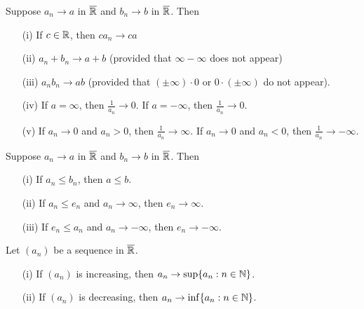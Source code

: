\documentclass[a4paper]{article}
\begin{document}
\begin{theorem}
    Suppose \( {a}_{n} \to a  \) in \( \overline{\mathbb{R}} \) and \( {b}_{n} \to b  \) in \( \overline{\mathbb{R}} \). Then
    \begin{enumerate}
        \item[(i)] If \( c \in \mathbb{R}  \), then \( {ca}_{n} \to ca \)
        \item[(ii)] \( {a}_{n} + {b}_{n} \to a + b \) (provided that \( \infty  - \infty   \) does not appear)
        \item[(iii)] \( {a}_{n}{b}_{n} \to ab \) (provided that \( (\pm \infty ) \cdot 0  \) or \( 0 \cdot (\pm \infty)  \) do not appear).
        \item[(iv)] If \( a = \infty   \), then \( \frac{ 1 }{ {a}_{n} }  \to 0  \). If \( a = - \infty  \), then \( \frac{ 1 }{ {a}_{n}  } \to 0  \).
        \item[(v)] If \( {a}_{n} \to 0  \) and \( {a}_{n} > 0  \), then \( \frac{ 1 }{ {a}_{n} }  \to \infty  \). If \( {a}_{n} \to 0  \) and \( {a}_{n} < 0  \), then \( \frac{ 1 }{ {a}_{n} } \to - \infty  \).
    \end{enumerate}
\end{theorem}

\begin{theorem}
    Suppose \( {a}_{n} \to a  \) in \( \overline{\mathbb{R}} \) and \( {b}_{n} \to b  \) in \( \overline{\mathbb{R}} \). Then
    \begin{enumerate}
        \item[(i)] If \( {a}_{n} \leq {b}_{n}  \), then \( a \leq b\).
        \item[(ii)] If \( {a}_{n} \leq {e}_{n} \) and \( {a}_{n} \to \infty   \), then \( {e}_{n} \to \infty   \).
        \item[(iii)] If \( {e}_{n} \leq {a}_{n}  \) and \( {a}_{n} \to - \infty  \), then \( {e}_{n} \to - \infty  \).
    \end{enumerate}
\end{theorem}

\begin{theorem}
    Let \( ({a}_{n}) \) be a sequence in \( \overline{\mathbb{R}} \).
    \begin{enumerate}
        \item[(i)] If \( ({a}_{n}) \) is increasing, then \( {a}_{n} \to \sup \{ {a}_{n} : n \in \mathbb{N} \}  \).
        \item[(ii)] If \( ({a}_{n})  \) is decreasing, then \( {a}_{n} \to \inf \{  {a}_{n} : n \in \mathbb{N} \}  \).
    \end{enumerate}
\end{theorem}
\end{document}
